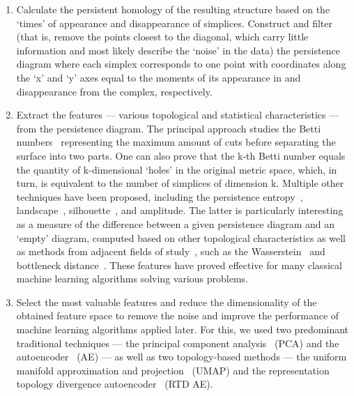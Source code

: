 \documentclass[10pt]{iopart}
\begin{document}
\begin{enumerate}
    \item 
        Calculate the persistent homology of the resulting structure based on the `times' of appearance and disappearance of simplices. Construct and filter (that is, remove the points closest to the diagonal, which carry little information and most likely describe the `noise' in the data) the persistence diagram where each simplex corresponds to one point with coordinates along the `x' and `y' axes equal to the moments of its appearance in and disappearance from the complex, respectively.

    \item 
        Extract the features --- various topological and statistical characteristics --- from the persistence diagram. The principal approach studies the Betti numbers~\cite{Zomorodian2005} representing the maximum amount of cuts before separating the surface into two parts. One can also prove that the k-th Betti number equals the quantity of k-dimensional `holes' in the original metric space, which, in turn, is equivalent to the number of simplices of dimension k. Multiple other techniques have been proposed, including the persistence entropy~\cite{10.1007/978-3-319-29228-1_11}, landscape~\cite{bubenik2015statisticaltopologicaldataanalysis}, silhouette~\cite{chazal2013stochasticconvergencepersistencelandscapes}, and amplitude. The latter is particularly interesting as a measure of the difference between a given persistence diagram and an `empty' diagram, computed based on other topological characteristics as well as methods from adjacent fields of study~\cite{kerber2016geometryhelpscomparepersistence}, such as the Wasserstein~\cite{10.1145/62212.62253} and bottleneck distance~\cite{Efrat2001}. These features have proved effective for many classical machine learning algorithms solving various problems.

    \item 
        Select the most valuable features and reduce the dimensionality of the obtained feature space to remove the noise and improve the performance of machine learning algorithms applied later. For this, we used two predominant traditional techniques --- the principal component analysis~\cite{Eckart_Young_1936} (PCA) and the autoencoder~\cite{Autoencoder} (AE) --- as well as two topology-based methods --- the uniform manifold approximation and projection~\cite{mcinnes2020umapuniformmanifoldapproximation} (UMAP) and the representation topology divergence autoencoder~\cite{trofimov2023learningtopologypreservingdatarepresentations} (RTD AE).
\end{enumerate}
\end{document}
